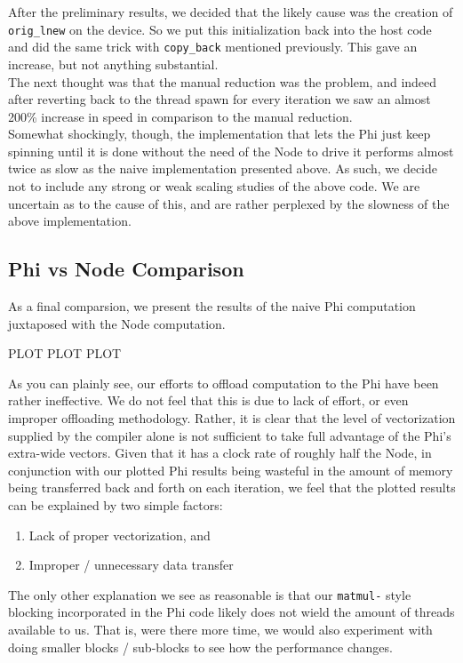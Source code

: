 \documentclass[11pt]{article}
\begin{document}
\noindent After the preliminary results, we decided that the likely cause was the creation of \texttt{orig\_lnew} on the device.  So we put this initialization back into the host code and did the same trick with \texttt{copy\_back} mentioned previously.  This gave an increase, but not anything substantial.\\

\noindent The next thought was that the manual reduction was the problem, and indeed after reverting back to the thread spawn for every iteration we saw an almost 200\% increase in speed in comparison to the manual reduction.\\

\noindent Somewhat shockingly, though, the implementation that lets the Phi just keep spinning until it is done without the need of the Node to drive it performs almost twice as slow as the naive implementation presented above.  As such, we decide not to include any strong or weak scaling studies of the above code.  We are uncertain as to the cause of this, and are rather perplexed by the slowness of the above implementation.

\subsection{Phi vs Node Comparison}

\noindent As a final comparsion, we present the results of the naive Phi computation juxtaposed with the Node computation.

\begin{center}
	{\Huge PLOT PLOT PLOT}
\end{center}

\noindent As you can plainly see, our efforts to offload computation to the Phi have been rather ineffective.  We do not feel that this is due to lack of effort, or even improper offloading methodology.  Rather, it is clear that the level of vectorization supplied by the compiler alone is not sufficient to take full advantage of the Phi's extra-wide vectors.  Given that it has a clock rate of roughly half the Node, in conjunction with our plotted Phi results being wasteful in the amount of memory being transferred back and forth on each iteration, we feel that the plotted results can be explained by two simple factors:

\begin{enumerate}[1.]
	\item Lack of proper vectorization, and
	\item Improper / unnecessary data transfer
\end{enumerate}

\noindent The only other explanation we see as reasonable is that our \texttt{matmul-} style blocking incorporated in the Phi code likely does not wield the amount of threads available to us.  That is, were there more time, we would also experiment with doing smaller blocks / sub-blocks to see how the performance changes.
\end{document}
